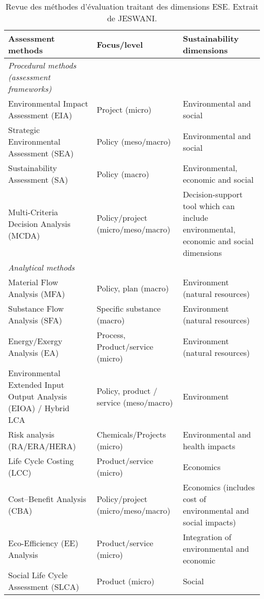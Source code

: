 \begin{table}
\begin{center}
\begin{tabular}{ p{4cm} p{4cm} p{4cm}}
\hline
Assessment methods & Focus/level & Sustainability dimensions \\
\hline
\emph{Procedural methods (assessment frameworks)} & &\\
\cline{1-1}
Environmental Impact Assessment (EIA) & Project (micro) & Environmental and social \\
Strategic Environmental Assessment (SEA) & Policy (meso/macro) & Environmental and social \\
Sustainability Assessment (SA) & Policy (macro) & Environmental, economic and social \\
Multi-Criteria Decision Analysis (MCDA) & Policy/project \newline (micro/meso/macro)& Decision-support tool which can include environmental, economic and social dimensions \\
\hline
\emph{Analytical methods} &&\\
\cline{1-1}
Material Flow Analysis (MFA) & Policy, plan (macro) & Environment (natural resources) \\
Substance Flow Analysis (SFA) & Specific substance (macro) & Environment (natural resources) \\
Energy/Exergy Analysis (EA) & Process, Product/service (micro) & Environment (natural resources) \\
Environmental Extended Input Output Analysis (EIOA) / Hybrid LCA & Policy, product / service (meso/macro) & Environment \\
Risk analysis (RA/ERA/HERA) & Chemicals/Projects (micro) & Environmental and health impacts \\
Life Cycle Costing (LCC) & Product/service (micro) & Economics \\
Cost–Benefit Analysis (CBA) & Policy/project \newline (micro/meso/macro) & Economics (includes cost of environmental and social impacts) \\
Eco-Efficiency (EE) Analysis & Product/service (micro) & Integration of environmental and economic \\
Social Life Cycle Assessment (SLCA) & Product (micro) & Social\\
\hline
\end{tabular}
\end{center}
\caption{Revue des méthodes d'évaluation traitant des dimensions ESE. Extrait de JESWANI\cite{jeswani_options_2010}.}
\label{tab:jeswani_options_2010}
\end{table}

